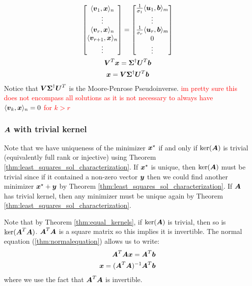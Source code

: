 \begin{gather*}
    \begin{bmatrix}
        \langle\boldsymbol{v}_1,\boldsymbol{x}\rangle_n\\
        \vdots\\
        \langle\boldsymbol{v}_r,\boldsymbol{x}\rangle_n\\
        \langle\boldsymbol{v}_{r+1},\boldsymbol{x}\rangle_n\\
        \vdots
    \end{bmatrix}=\begin{bmatrix}
        \frac{1}{\sigma_1}\langle\boldsymbol{u}_1,\boldsymbol{b}\rangle_m\\
        \vdots\\
        \frac{1}{\sigma_r}\langle\boldsymbol{u}_r,\boldsymbol{b}\rangle_m\\
        0\\
        \vdots
    \end{bmatrix}\\
    \boldsymbol{V}^T\boldsymbol{x}=\boldsymbol{\Sigma}^{\dagger}\boldsymbol{U}^T\boldsymbol{b}\\
    \boldsymbol{x}=\boldsymbol{V}\boldsymbol{\Sigma}^{\dagger}\boldsymbol{U}^T\boldsymbol{b}
\end{gather*}
Notice that $\boldsymbol{V}\boldsymbol{\Sigma}^{\dagger}\boldsymbol{U}^T$ is the Moore-Penrose Pseudoinverse. \textcolor{red}{im pretty sure this does not encompass all solutions as it is not necessary to always have $\langle\boldsymbol{v}_k,\boldsymbol{x}\rangle_n=0$ for $k>r$}

\subsubsection{$\boldsymbol{A}$ with trivial kernel}

Note that we have uniqueness of the minimizer $\boldsymbol{x}^\star$ if and only if $\ker(\boldsymbol{A})$ is trivial (equivalently full rank or injective) using Theorem \ref{thm:least_squares_sol_characterization}.  If $\boldsymbol{x}^\star$ is unique, then $\ker(\boldsymbol{A})$ must be trivial since if it contained a non-zero vector $\boldsymbol{y}$ then we could find another minimizer $\boldsymbol{x}^\star+\boldsymbol{y}$ by Theorem \ref{thm:least_squares_sol_characterization}. If $\boldsymbol{A}$ has trivial kernel, then any minimizer must be unique again by Theorem \ref{thm:least_squares_sol_characterization}.

Note that by Theorem \ref{thm:equal_kernels}, if $\ker(\boldsymbol{A})$ is trivial, then so is $\ker(\boldsymbol{A}^T\boldsymbol{A})$. $\boldsymbol{A}^T\boldsymbol{A}$ is a square matrix so this implies it is invertible. The normal equation (\ref{thm:normalequation}) allows us to write:
\begin{align*}
    \boldsymbol{A}^T\boldsymbol{A}\boldsymbol{x}=\boldsymbol{A}^T\boldsymbol{b}\\
    \boldsymbol{x}=(\boldsymbol{A}^T\boldsymbol{A})^{-1}\boldsymbol{A}^T\boldsymbol{b}
\end{align*}
where we use the fact that $\boldsymbol{A}^T\boldsymbol{A}$ is invertible.

